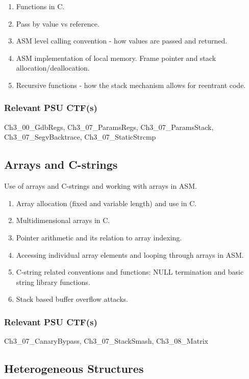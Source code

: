 \documentclass[12pt,letterpaper]{article}
\begin{document}
	\begin{enumerate}
		\item Functions in C.
		\item Pass by value vs reference.
		\item ASM level calling convention - how values are passed and returned.
		\item ASM implementation of local memory. Frame pointer and stack allocation/deallocation.
		\item Recursive functions - how the stack mechanism allows for reentrant code. 
	\end{enumerate}
	
	\subsubsection*{Relevant PSU CTF(s)}

	Ch3\_00\_GdbRegs, Ch3\_07\_ParamsRegs, Ch3\_07\_ParamsStack, Ch3\_07\_SegvBacktrace, Ch3\_07\_StaticStrcmp


	\subsection{Arrays and C-strings}

	Use of arrays and C-strings and working with arrays in ASM.

	\begin{enumerate}
		\item Array allocation (fixed and variable length) and use in C. 
		\item Multidimensional arrays in C.
		\item Pointer arithmetic and its relation to array indexing.
		\item Accessing individual array elements and looping through arrays in ASM.
		\item C-string related conventions and functions: NULL termination and basic string library functions.
		\item Stack based buffer overflow attacks.
	\end{enumerate}
	
	\subsubsection*{Relevant PSU CTF(s)}

	Ch3\_07\_CanaryBypass, Ch3\_07\_StackSmash, Ch3\_08\_Matrix


	\subsection{Heterogeneous Structures}
\end{document}
